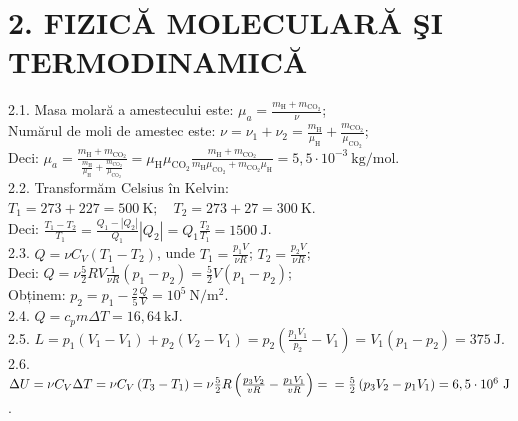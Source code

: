 
\section*{2. FIZICĂ MOLECULARĂ ŞI TERMODINAMICĂ}

2.1. Masa molară a amestecului este: $\mu_{a}=\frac{m_{\mathrm{H}}+m_{\mathrm{CO}_{2}}}{\nu}$;\\ Numărul de moli de amestec este: $\nu=\nu_{1}+\nu_{2}=\frac{m_{\mathrm{H}}}{\mu_{\mathrm{H}}}+\frac{m_{\mathrm{CO}_{2}}}{\mu_{\mathrm{CO}_{2}}}$;\\ Deci: $\mu_{a}=\frac{m_{\mathrm{H}}+m_{\mathrm{CO}_{2}}}{\frac{m_{\mathrm{H}}}{\mu_{\mathrm{H}}}+\frac{m_{\mathrm{CO}_{2}}}{\mu_{\mathrm{CO}_{2}}}}=\mu_{\mathrm{H}} \mu_{\mathrm{CO}_{2}} \frac{m_{\mathrm{H}}+m_{\mathrm{CO}_{2}}}{m_{\mathrm{H}} \mu_{\mathrm{CO}_{2}}+m_{\mathrm{CO}_{2}} \mu_{\mathrm{H}}}=5,5 \cdot 10^{-3} \mathrm{~kg} / \mathrm{mol}$.\\

2.2. Transformăm Celsius în Kelvin:\\ $T_{1}=273+227=500 \mathrm{~K}; \quad T_{2}=273+27=300 \mathrm{~K}$.\\ Deci: $\frac{T_{1}-T_{2}}{T_{1}}=\frac{Q_{1}-\left|Q_{2}\right|}{Q_{1}}\left|Q_{2}\right|=Q_{1} \frac{T_{2}}{T_{1}}=1500 \mathrm{~J}$.\\

2.3. $Q=\nu C_{V}\left(T_{1}-T_{2}\right)$, unde $T_{1}=\frac{p_{1} V}{\nu R}$; $T_{2}=\frac{p_{2} V}{\nu R}$;\\ Deci: $Q=\nu \frac{5}{2} R V \frac{1}{\nu R}\left(p_{1}-p_{2}\right)=\frac{5}{2} V\left(p_{1}-p_{2}\right)$;\\ Obținem: $p_{2}=p_{1}-\frac{2}{5} \frac{Q}{V}=10^{5} \mathrm{~N} / \mathrm{m}^{2}$.\\

2.4. $Q=c_{p} m \Delta T=16,64 \mathrm{~kJ}$.\\

2.5. $L=p_{1}\left(V_{1}-V_{1}\right)+p_{2}\left(V_{2}-V_{1}\right)=p_{2}\left(\frac{p_{1} V_{1}}{p_{2}}-V_{1}\right)=V_{1}\left(p_{1}-p_{2}\right)=375 \mathrm{~J}$.\\

2.6. $\Delta U=\nu C_{V} \Delta T=\nu C_{V}\left(T_{3}-T_{1}\right)=\nu \frac{5}{2} R\left(\frac{p_{3} V_{2}}{v R}-\frac{p_{1} V_{1}}{v R}\right)= \\ =\frac{5}{2}\left(p_{3} V_{2}-p_{1} V_{1}\right)=6,5 \cdot 10^{6} \mathrm{~J}$.\\

